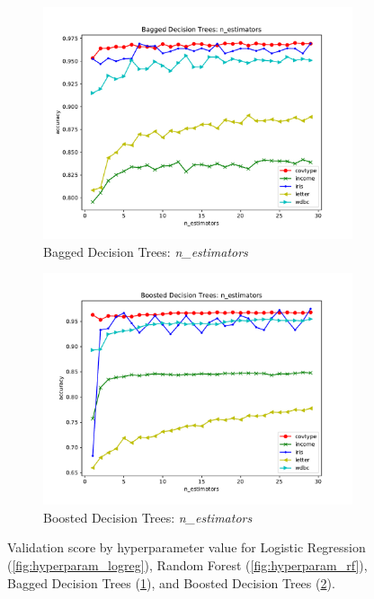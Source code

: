 \documentclass[twoside,11pt]{article}
\begin{document}
\begin{figure}[h]
				\begin{subfigure}[b]{.45\linewidth}
					\includegraphics[width=\linewidth]{bagdt_hyperparam}
					\caption{Bagged Decision Trees: \textit{n\_estimators}}
					\label{fig:hyperparam_bagdt}
				\end{subfigure}
				\begin{subfigure}[b]{.45\linewidth}
					\includegraphics[width=\linewidth]{bstdt_hyperparam}
					\caption{Boosted Decision Trees: \textit{n\_estimators}}
					\label{fig:hyperparam_bstdt}
				\end{subfigure}
				
				\caption{Validation score by hyperparameter value for Logistic Regression (\ref{fig:hyperparam_logreg}), Random Forest (\ref{fig:hyperparam_rf}), Bagged Decision Trees (\ref{fig:hyperparam_bagdt}), and Boosted Decision Trees (\ref{fig:hyperparam_bstdt}).}
				\label{fig:hyperparam_others}
			\end{figure}
		
\end{document}
